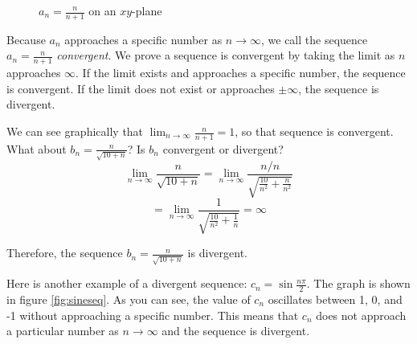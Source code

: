 \begin{figure}[H]
    \centering
    \caption{$a_n =\frac{n}{n+1}$ on an $xy$-plane}
    \label{fig:planefrac}
\end{figure}

Because $a_n$ approaches a specific number as $n \to \infty$, we call the
sequence $a_n = \frac{n}{n+1}$ \textit{convergent}. We prove a sequence is
convergent by taking the limit as $n$ approaches $\infty$. If the limit exists
and approaches a specific number, the sequence is convergent. If the limit
does not exist or approaches $\pm\infty$, the sequence is divergent.

We can see graphically that $\lim_{n \to \infty} \frac{n}{n+1} = 1$, so that
sequence is convergent. What about $b_n = \frac{n}{\sqrt{10 + n}}$? Is $b_n$
convergent or divergent?
$$\lim_{n \to \infty} \frac{n}{\sqrt{10 + n}} =
    \lim_{n \to \infty} \frac{n/n}{\sqrt{\frac{10}{n^2}+ \frac{n}{n^2}}}$$
$$=\lim_{n \to \infty} \frac{1}{\sqrt{\frac{10}{n^2}+\frac{1}{n}}} = \infty$$

Therefore, the sequence $b_n = \frac{n}{\sqrt{10 + n}}$ is divergent.

Here is another example of a divergent sequence: $c_n = \sin{\frac{n\pi}{2}}$.
The graph is shown in figure \ref{fig:sineseq}. As you can see, the value of
$c_n$ oscillates between 1, 0, and -1 without approaching a specific number.
This means that $c_n$ does not approach a particular number as $n \to \infty$
and the sequence is divergent.

